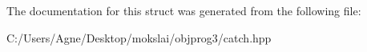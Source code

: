 The documentation for this struct was generated from the following file\+:\begin{DoxyCompactItemize}
\item 
C\+:/\+Users/\+Agne/\+Desktop/mokslai/objprog3/catch.\+hpp\end{DoxyCompactItemize}
